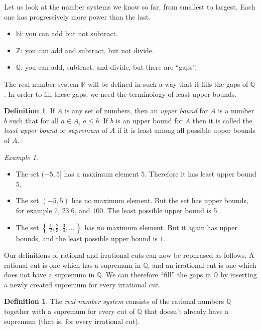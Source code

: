 \documentclass[11pt,oneside]{amsbook}
\newcommand{\set}[1]{\left\{\,#1\,\right\}}
\newcommand{\N}{\mathbb N}
\newcommand{\Z}{\mathbb Z}
\newcommand{\Q}{\mathbb Q}
\newcommand{\R}{\mathbb R}
\theoremstyle{definition}
\theoremstyle{plain}
\theoremstyle{definition}
\newtheorem{defn}[thm]{Definition}
\theoremstyle{remark}
\newtheorem{example}[thm]{Example}
\numberwithin{equation}{section}
\numberwithin{figure}{section}
\begin{document}
Let us look at the number systems we know so far, from smallest to largest. Each one has progressively more power than the last.
\begin{itemize}
\item $\N$: you can add but not subtract.
\item $\Z$: you can add and subtract, but not divide.
\item $\Q$: you can add, subtract, and divide, but there are ``gaps''.
\end{itemize}

The real number system $\R$ will be defined in such a way that it fills the gaps of $\Q$. In order to fill these gaps, we need the terminology of least upper bounds.

\begin{defn}
  If $A$ is any set of numbers, then an \emph{upper bound} for $A$ is a number $b$ such that for all $a\in A$, $a\leq b$. If $b$ is an upper bound for $A$ then it is called the \emph{least upper bound} or \emph{supremum} of $A$ if it is least among all possible upper bounds of $A$.
\end{defn}

\begin{example}
  \begin{itemize}
  \item The set $(-5,5]$ has a maximum element $5$. Therefore it has least upper bound $5$.
  \item The set $(-5,5)$ has no maximum element. But the set has upper bounds, for example $7$, $23.6$, and $100$. The least possible upper bound is $5$.
  \item The set $\set{\frac12,\frac23,\frac34,\ldots}$ has no maximum element. But it again has upper bounds, and the least possible upper bound is $1$.
  \end{itemize}
\end{example}

Our definitions of rational and irrational cuts can now be rephrased as follows. A rational cut is one which has a supremum in $\Q$, and an irrational cut is one which does not have a supremum in $\Q$. We can therefore ``fill'' the gaps in $\Q$ by inserting a newly created supremum for every irrational cut.

\begin{defn}
  The \emph{real number system} consists of the rational numbers $\Q$ together with a supremum for every cut of $\Q$ that doesn't already have a supremum (that is, for every irrational cut).
\end{defn}
\end{document}
